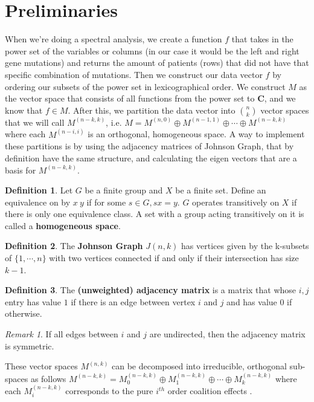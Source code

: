 \documentclass{article}
\theoremstyle{remark}
\newtheorem*{remark}{Remark}
\theoremstyle{definition}
\newtheorem{definition}{Definition}[section]
\begin{document}
\section{Preliminaries}
    When we're doing a spectral analysis, we create a function $f$ that takes in the power set of the variables or columns (in our case it would be the left and right gene mutations) and returns the amount of patients (rows) that did not have that specific combination of mutations. Then we construct our data vector $f$ by ordering our subsets of the power set in lexicographical order. We construct $M$ as the vector space that consists of all functions from the power set to $\mathbf{C}$, and we know that $f \in M$. After this, we partition the data vector into $n \choose k$ vector spaces that we will call $M^{(n-k,k)}$, i.e. $M = M^{(n,0)} \oplus M^{(n-1,1)} \oplus \cdots \oplus M^{(n-k,k)}$ where each $M^{(n-i,i)}$ is an orthogonal, homogeneous space\cite{David}. A way to implement these partitions is by using the adjacency matrices of Johnson Graph, that by definition have the same structure, and calculating the eigen vectors that are a basis for $M^{(n-k,k)}$. 
    \begin{definition}
        Let $G$ be a finite group and $X$ be a finite set. Define an equivalence on by $x ~ y$ if for some $s \in G, sx = y$. $G$ operates transitively on $X$ if there is only one equivalence class. A set with a group acting transitively on it is called a \textbf{homogeneous space}.
    \end{definition}
    \begin{definition}\cite{Jgraph} 
        The \textbf{Johnson Graph} $J(n,k)$ has vertices given by the k-subsets of $\{1,\cdots,n\}$ with two vertices connected if and only if their intersection has size $k-1$.
    \end{definition}
    \begin{definition} 
        The \textbf{(unweighted) adjacency matrix} is a matrix that whose $i,j$ entry has value $1$ if there is an edge between vertex $i$ and $j$ and has value $0$ if otherwise. 
    \end{definition}
    \begin{remark} 
        If all edges between $i$ and $j$ are undirected, then the adjacency matrix is symmetric. 
    \end{remark}
    These vector spaces $M^{(n,k)}$ can be decomposed into irreducible, orthogonal sub-spaces as follows $M^{(n-k,k)} = M^{(n-k,k)}_0 \oplus M^{(n-k,k)}_1 \oplus \cdots \oplus M^{(n-k,k)}_k$ where each $M^{(n-k,k)}_i$ corresponds to the pure $i^{th}$ order coalition effects \cite{David}.
\end{document}
